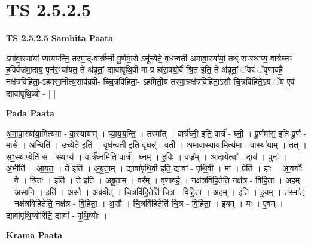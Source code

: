 \documentclass[17pt]{extarticle}
\begin{document}
\section*{ TS 2.5.2.5 }

\textbf{TS 2.5.2.5 } \newline
\textbf{Samhita Paata} \newline

ऽमा॑वा॒स्या॑यां प्याययन्ति॒ तस्मा॒द्-वार्त्र॑घ्नी पू॒र्णमा॒से ऽनू᳚च्येते॒ वृध॑न्वती अमावा॒स्या॑यां॒ तथ् सꣳ॒॒स्थाप्य॒ वार्त्र॑घ्नꣳ ह॒विर्वज्र॑मा॒दाय॒ पुन॑र॒भ्या॑यत॒ ते अ॑ब्रूतां॒ द्यावा॑पृथि॒वी मा प्र हा॑रा॒वयो॒र्वै श्रि॒त इति॒ ते अ॑ब्रूतां॒ ॅवरं॑ ॅवृणावहै॒ नक्ष॑त्रविहिता॒-ऽहमसा॒नीत्य॒साव॑ब्रवी- च्चि॒त्रवि॑हिता॒- ऽहमिती॒यं तस्मा॒न्नक्ष॑त्रविहिता॒ऽसौ चि॒त्रवि॑हिते॒ऽयं ॅय ए॒वं द्यावा॑पृथि॒व्यो - [  ] \newline

\textbf{Pada Paata} \newline

अ॒मा॒वा॒स्या॑या॒मित्य॑मा - वा॒स्या॑याम् । प्या॒य॒य॒न्ति॒ । तस्मा᳚त् । वार्त्र॑घ्नी॒ इति॒ वार्त्र॑ - घ्नी॒ । पू॒र्णमा॑स॒ इति॑ पू॒र्ण - मा॒से॒ । अन्विति॑ । उ॒च्ये॒ते॒ इति॑ । वृध॑न्वती॒ इति॒ वृधन्न्॑ - व॒ती॒ । अ॒मा॒वा॒स्या॑या॒मित्य॑मा - वा॒स्या॑याम् । तत् । सꣳ॒॒स्थाप्येति॑ सं - स्थाप्य॑ । वार्त्र॑घ्न॒मिति॒ वार्त्र॑ - घ्न॒म् । ह॒विः । वज्र᳚म् । आ॒दायेत्या᳚ - दाय॑ । पुनः॑ । अ॒भीति॑ । आ॒य॒त॒ । ते इति॑ । अ॒ब्रू॒ता॒म् । द्यावा॑पृथि॒वी इति॒ द्यावा᳚ - पृ॒थि॒वी । मा । प्रेति॑ । हाः॒ । आ॒वयोः᳚ । वै । श्रि॒तः । इति॑ । ते इति॑ । अ॒ब्रू॒ता॒म् । वर᳚म् । वृ॒णा॒व॒है॒ । नक्ष॑त्रविहि॒तेति॒ नक्ष॑त्र - वि॒हि॒ता॒ । अ॒हम् । असा॑नि । इति॑ । अ॒सौ । अ॒ब्र॒वी॒त् । चि॒त्रवि॑हि॒तेति॑ चि॒त्र - वि॒हि॒ता॒ । अ॒हम् । इति॑ । इ॒यम् । तस्मा᳚त् । नक्ष॑त्रविहि॒तेति॒ नक्ष॑त्र - वि॒हि॒ता॒ । अ॒सौ । चि॒त्रवि॑हि॒तेति॑ चि॒त्र - वि॒हि॒ता॒ । इ॒यम् । यः । ए॒वम् । द्यावा॑पृथि॒व्योरिति॒ द्यावा᳚ - पृ॒थि॒व्योः ।  \newline


\textbf{Krama Paata} \newline
\end{document}
